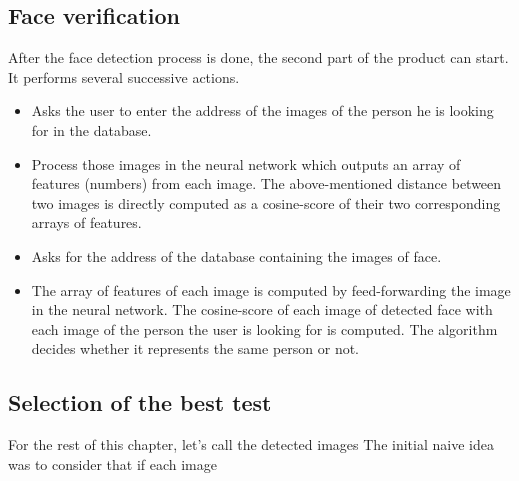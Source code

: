 \subsection{Face verification}
After the face detection process is done, the second part of the product can start.
It performs several successive actions.
\begin{itemize}
\item Asks the user to enter the address of the images of the person he is looking for in the database.
\item Process those images in the neural network which outputs an array of features (numbers) from each image. The above-mentioned distance between two images is directly computed as a cosine-score of their two corresponding arrays of features.
\item Asks for the address of the database containing the images of face.
\item The array of features of each image is computed by feed-forwarding the image in the neural network. The cosine-score of each image of detected face with each image of the person the user is looking for is computed. The algorithm decides whether it represents the same person or not.
\end{itemize}
\subsection{Selection of the best test}
For the rest of this chapter, let's call the detected images The initial naive idea was to consider that if each image